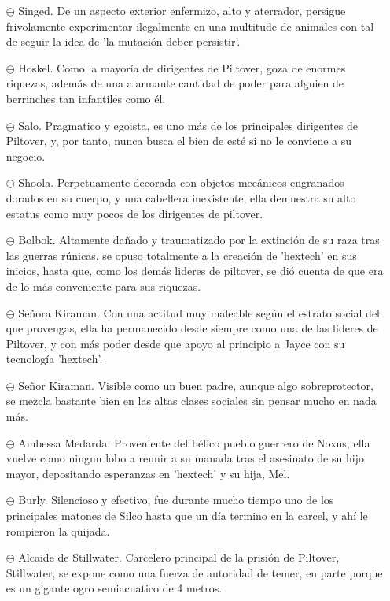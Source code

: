 \documentclass[11pt,a5paper]{article}
\begin{document}
\begin{itemize}
    \item[$\ominus$] Singed. De un aspecto exterior enfermizo, alto y aterrador, persigue frivolamente experimentar ilegalmente en una multitude de animales con tal de seguir la idea de 'la mutación deber persistir'.
    \item[$\ominus$] Hoskel. Como la mayoría de dirigentes de Piltover, goza de enormes riquezas, además de una alarmante cantidad de poder para alguien de berrinches tan infantiles como él. 
    \item[$\ominus$] Salo. Pragmatico y egoista, es uno más de los principales dirigentes de Piltover, y, por tanto, nunca busca el bien de esté si no le conviene a su negocio.
    \item[$\ominus$] Shoola. Perpetuamente decorada con objetos mecánicos engranados dorados en su cuerpo, y una cabellera inexistente, ella demuestra su alto estatus como muy pocos de los dirigentes de piltover.
    \item[$\ominus$] Bolbok. Altamente dañado y traumatizado por la extinción de su raza tras las guerras rúnicas, se opuso totalmente a la creación de 'hextech' en sus inicios, hasta que, como los demás lideres de piltover, se dió cuenta de que era de lo más conveniente para sus riquezas.
    \item[$\ominus$] Señora Kiraman. Con una actitud muy maleable según el estrato social del que provengas, ella ha permanecido desde siempre como una de las lideres de Piltover, y con más poder desde que apoyo al principio a Jayce con su tecnología 'hextech'.
    \item[$\ominus$] Señor Kiraman. Visible como un buen padre, aunque algo sobreprotector, se mezcla bastante bien en las altas clases sociales sin pensar mucho en nada más.
    \item[$\ominus$] Ambessa Medarda. Proveniente del bélico pueblo guerrero de Noxus, ella vuelve como ningun lobo a reunir a su manada tras el asesinato de su hijo mayor, depositando esperanzas en 'hextech' y su hija, Mel.
    \item[$\ominus$] Burly. Silencioso y efectivo, fue durante mucho tiempo uno de los principales matones de Silco hasta que un día termino en la carcel, y ahí le rompieron la quijada.
    \item[$\ominus$] Alcaide de Stillwater. Carcelero principal de la prisión de Piltover, Stillwater, se expone como una fuerza de autoridad de temer, en parte porque es un gigante ogro semiacuatico de 4 metros.

\end{itemize}
\end{document}

